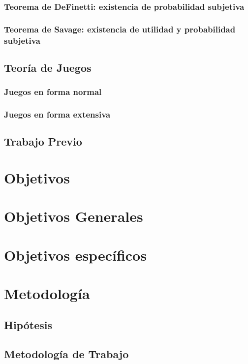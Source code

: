 \documentclass[11pt]{article}
\theoremstyle{plain}
\begin{document}
		\subsubsection{Teorema de DeFinetti: existencia de probabilidad subjetiva}
		\subsubsection{Teorema de Savage: existencia de utilidad y probabilidad subjetiva}
	\subsection{Teoría de Juegos}
		\subsubsection{Juegos en forma normal}
		\subsubsection{Juegos en forma extensiva}
	
	\subsection{Trabajo Previo}

\section{Objetivos}
	\section{Objetivos Generales}
	\section{Objetivos específicos}
	
\section{Metodología}
	\subsection{Hipótesis}
	\subsection{Metodología de Trabajo}
\end{document}
